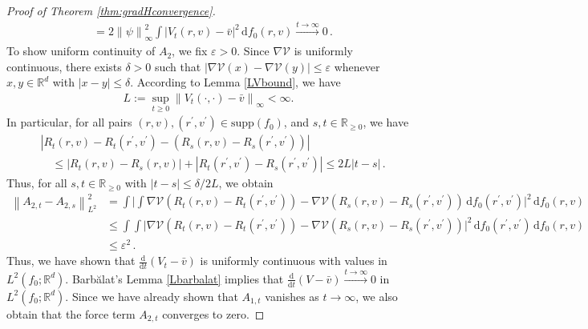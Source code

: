 \documentclass[11pt]{article}
\newcommand{\R}[0]{\mathbb R}
\newcommand{\dx}[1]{\frac{\mathrm{d}}{\mathrm{d}#1}}
\newcommand{\norm}[1]{\left\| #1 \right\|}
\newcommand{\abs}[1]{\left| #1 \right|}
\newcommand{\supp}{\mathrm{supp}}
\newcommand{\msolinit}[1]{f_0(#1)}
\newcommand{\charX}[2]{R_{#1}(#2) }
\newcommand{\charV}[2]{V_{#1}(#2)}
\begin{document}
\begin{bibunit}[unsrtnat]
\begin{proof}[Proof of Theorem \ref{thm:gradHconvergence}]
\begin{align*}
              &= 2 \norm{\psi}_\infty^{2} \int \big| \charV{t}{r,v} - \bar{v} \big|^{2} \, \mathrm{d} \msolinit{r, v} \stackrel{t \to \infty}{\to} 0 \, .
         \end{align*}
         To show uniform continuity of $A_2$, we fix $\varepsilon > 0$. Since $\nabla \mathcal{V}$ is uniformly continuous, there exists $\delta > 0$ such that $\abs{\nabla \mathcal{V}(x) - \nabla \mathcal{V}(y) } \leq \varepsilon $ whenever $x,y \in \R^d$ with $\abs{x-y} \leq \delta$. According to Lemma \ref{LVbound}, we have 
         \begin{align*} 
             L := \sup_{t \geq 0} \norm{\charV{t}{\cdot, \cdot} - \bar{v}}_\infty < \infty .
         \end{align*}
         In particular, for all pairs $(r,v), (r^\prime, v^\prime) \in \supp(f_0)$, and  $s,t \in \R_{\geq 0}$, we have 
         \begin{align*} 
             &\abs{ \charX{t}{r,v} - \charX{t}{r^\prime, v^\prime} - (\charX{s}{r,v} - \charX{s}{r^\prime, v^\prime} ) } \\
             &\quad \leq \abs{ \charX{t}{r,v} - \charX{s}{r,v} } +
             \abs{ \charX{t}{r^\prime,v^\prime} - \charX{s}{r^\prime,v^\prime} }
             \leq 2 L \abs{t-s} \, .
         \end{align*}
         Thus, for all $s,t \in \R_{\geq 0}$ with $\abs{t-s} \leq \delta /{2L}$, we obtain 
         \begin{align*}
             \norm{A_{2,t} - A_{2,s}}_{L^2}^2 
             &= \int \Big| \int \nabla \mathcal{V}( \charX{t}{r,v} - \charX{t}{r^\prime, v^\prime} ) - \nabla \mathcal{V}( \charX{s}{r,v} - \charX{s}{r^\prime, v^\prime} ) \,  \mathrm{d} \msolinit{r^\prime, v^\prime} \Big|^{2} \, \mathrm{d}\msolinit{r,v} \\
             & \leq \int  \int \big|\nabla \mathcal{V}( \charX{t}{r,v} - \charX{t}{r^\prime, v^\prime} ) - \nabla \mathcal{V}( \charX{s}{r,v} - \charX{s}{r^\prime, v^\prime} ) \big|^{2} \,  \mathrm{d}\msolinit{r^\prime, v^\prime} \, \mathrm{d}\msolinit{r,v} \\
             &\leq \varepsilon^2 \, .
         \end{align*}
         Thus, we have shown that $\dx{t}(V_t - \bar{v})$ is uniformly continuous with values in $L^{2} (f_0;\R^d)$. {B}arb\u alat's Lemma \ref{Lbarbalat} implies that $\dx{t}(V - \bar{v}) \stackrel{t \to \infty}{\to} 0$ in $L^{2} (f_0;\R^d)$. Since we have already shown that $A_{1,t}$ vanishes as $t \to \infty$, we also obtain that the force term $A_{2,t}$ converges to zero. 
\end{proof}


\end{bibunit}
\end{document}
